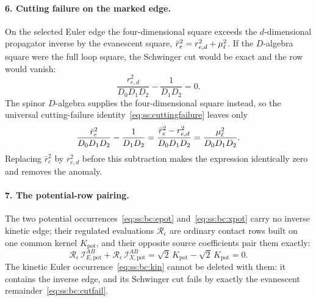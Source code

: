 \paragraph{6. Cutting failure on the marked edge.}
On the selected Euler edge the four-dimensional square exceeds the
$d$-dimensional propagator inverse by the evanescent square,
$\bar r_{e}^{2}=r_{e,d}^{2}+\mu_\ell^{2}$. If the $D$-algebra square were the full
loop square, the Schwinger cut would be exact and the row would vanish:
\begin{equation}\label{eq:ss:bc:exactcut}
\frac{r_{e,d}^{2}}{D_{0}D_{1}D_{2}}-\frac{1}{D_{1}D_{2}}=0 .
\end{equation}
The spinor $D$-algebra supplies the four-dimensional square instead, so the
universal cutting-failure identity~\eqref{eq:ss:cuttingfailure} leaves only
\begin{equation}\label{eq:ss:bc:cutfail}
\frac{\bar r_{e}^{2}}{D_{0}D_{1}D_{2}}-\frac{1}{D_{1}D_{2}}
=\frac{\bar r_{e}^{2}-r_{e,d}^{2}}{D_{0}D_{1}D_{2}}
=\frac{\mu_\ell^{2}}{D_{0}D_{1}D_{2}} .
\end{equation}
Replacing $\bar r_{e}^{2}$ by $r_{e,d}^{2}$ before this subtraction makes the
expression identically zero and removes the anomaly.

\paragraph{7. The potential-row pairing.}
The two potential occurrences~\eqref{eq:ss:bc:epot} and~\eqref{eq:ss:bc:xpot}
carry no inverse kinetic edge; their regulated evaluations
$\mathcal R_{\epsilon}$ are ordinary contact rows built on one common kernel
$K_{\mathrm{pot}}$, and their opposite source coefficients pair them exactly:
\begin{equation}\label{eq:ss:bc:potpair}
\mathcal R_{\epsilon}\,\mathcal I_{E,\mathrm{pot}}^{AB}
+\mathcal R_{\epsilon}\,\mathcal I_{X,\mathrm{pot}}^{AB}
=\sqrt2\,K_{\mathrm{pot}}-\sqrt2\,K_{\mathrm{pot}}=0 .
\end{equation}
The kinetic Euler occurrence~\eqref{eq:ss:bc:kin} cannot be deleted with them:
it contains the inverse edge, and its Schwinger cut fails by exactly the
evanescent remainder~\eqref{eq:ss:bc:cutfail}.

